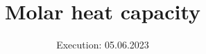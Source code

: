 

\subject{V47}
\title{Molar heat capacity}
\date{%
  Execution: 05.06.2023
}



\maketitle
\thispagestyle{empty}
\tableofcontents
\newpage






\printbibliography{}

% 


